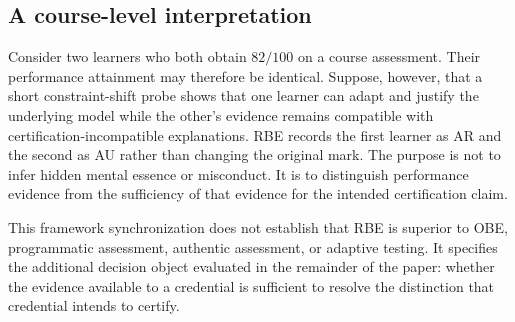 \subsection{A course-level interpretation}
Consider two learners who both obtain $82/100$ on a course assessment. Their performance attainment may therefore be identical. Suppose, however, that a short constraint-shift probe shows that one learner can adapt and justify the underlying model while the other's evidence remains compatible with certification-incompatible explanations. RBE records the first learner as AR and the second as AU rather than changing the original mark. The purpose is not to infer hidden mental essence or misconduct. It is to distinguish performance evidence from the sufficiency of that evidence for the intended certification claim.

This framework synchronization does not establish that RBE is superior to OBE, programmatic assessment, authentic assessment, or adaptive testing. It specifies the additional decision object evaluated in the remainder of the paper: whether the evidence available to a credential is sufficient to resolve the distinction that credential intends to certify.
